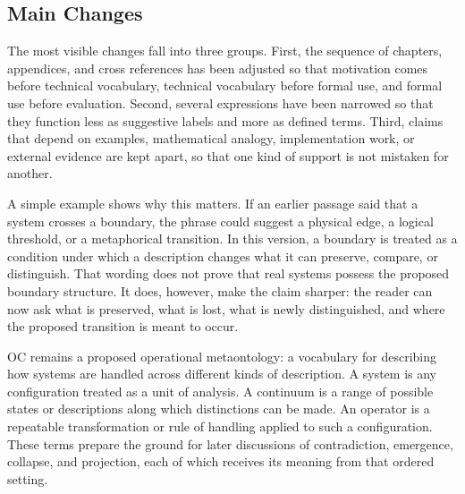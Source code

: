 \documentclass[11pt,a4paper,openany]{book}
\begin{document}
\subsection{Main Changes}
The most visible changes fall into three groups. First, the sequence of chapters, appendices, and cross references has been adjusted so that motivation comes before technical vocabulary, technical vocabulary before formal use, and formal use before evaluation. Second, several expressions have been narrowed so that they function less as suggestive labels and more as defined terms. Third, claims that depend on examples, mathematical analogy, implementation work, or external evidence are kept apart, so that one kind of support is not mistaken for another. \cite{grimmett_percolation,goldenfeld_lectures}\par
A simple example shows why this matters. If an earlier passage said that a system crosses a boundary, the phrase could suggest a physical edge, a logical threshold, or a metaphorical transition. In this version, a boundary is treated as a condition under which a description changes what it can preserve, compare, or distinguish. That wording does not prove that real systems possess the proposed boundary structure. It does, however, make the claim sharper: the reader can now ask what is preserved, what is lost, what is newly distinguished, and where the proposed transition is meant to occur.\par
OC remains a proposed operational metaontology: a vocabulary for describing how systems are handled across different kinds of description. A system is any configuration treated as a unit of analysis. A continuum is a range of possible states or descriptions along which distinctions can be made. An operator is a repeatable transformation or rule of handling applied to such a configuration. These terms prepare the ground for later discussions of contradiction, emergence, collapse, and projection, each of which receives its meaning from that ordered setting.\par
\end{document}
